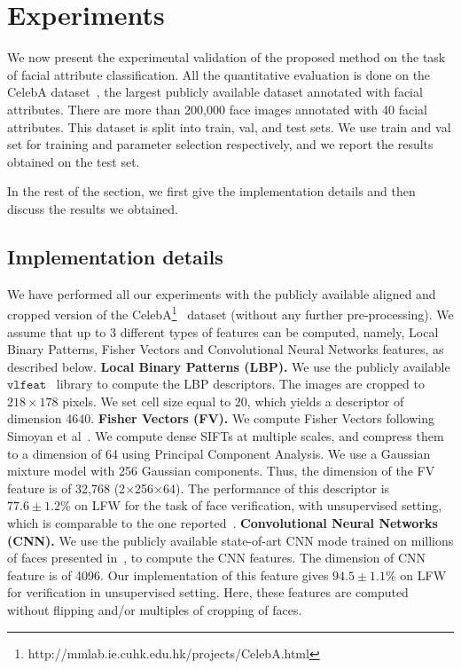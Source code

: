\documentclass{sig-alternate-05-2015}
\begin{document}
\section{Experiments}\label{sec:experiments}
We now present the experimental validation of the proposed method on the task of facial attribute classification. All the quantitative evaluation is done on the CelebA dataset~\cite{liu2015deep}, the largest publicly available dataset annotated with facial attributes. There are more than 200,000 face images annotated with 40 facial attributes. This dataset is split into train, val, and test sets. We use train and val set for training and parameter selection respectively, and we report the results obtained on the test set.

In the rest of the section, we first give the implementation details and then discuss the results we obtained.

\subsection{Implementation details}
We have performed all our experiments with 
the publicly available aligned and cropped version of the CelebA\footnote{http://mmlab.ie.cuhk.edu.hk/projects/CelebA.html}~\cite{liu2015deep} dataset (without any further pre-processing). We assume that up to 3 different types of features can be computed, namely, Local Binary Patterns, Fisher Vectors and Convolutional Neural Networks features, as described below. 
\textbf{Local Binary Patterns (LBP).} We use the publicly available
$\texttt{vlfeat}$~\cite{Vedaldi2008} library to compute the LBP descriptors. The images are cropped to $218\times 178$ pixels. We set cell size equal to $20$, which yields a descriptor of dimension 4640.
\textbf{Fisher Vectors (FV).} 
We compute Fisher Vectors following Simoyan et al~\cite{simonyan2013fisher}. We compute dense SIFTs at multiple scales, and compress them to a dimension of 64 using Principal Component Analysis. We use a Gaussian mixture model with 256 Gaussian components. Thus, the dimension of the FV feature is of 32,768 (2$\times$256$\times$64). The performance of this descriptor is $77.6 \pm 1.2\%$ on LFW for the task of face verification, with unsupervised setting, which is comparable to the one reported~\cite{simonyan2013fisher}. 
\textbf{Convolutional Neural Networks (CNN).}
We use the publicly available state-of-art CNN mode trained on millions of faces presented in~\cite{parkhi2015deep}, to compute the CNN features. The dimension of CNN feature is of 4096. Our implementation of this feature gives $94.5 \pm 1.1\%$ on LFW for verification in unsupervised setting. Here, these features are computed without flipping and/or multiples of cropping of faces.
\end{document}
